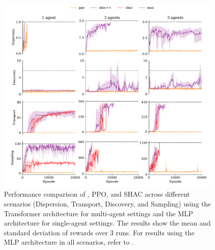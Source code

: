 \begin{figure}[!t]
    \includegraphics[width=\textwidth]{figs/main-transformer.pdf}
    \caption{Performance comparison of \fname{}, PPO, and SHAC across different scenarios (Dispersion, Transport, Discovery, and Sampling) using the Transformer architecture for multi-agent settings and the MLP architecture for single-agent settings. The results show the mean and standard deviation of rewards over 3 runs. For results using the MLP architecture in all scenarios, refer to .}
    \label{fig:experiments}
\end{figure}

